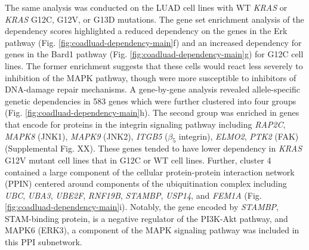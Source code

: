 \documentclass[english, 10pt, letterpaper]{article}
\newcommand{\KRAS}{\emph{KRAS}}
\begin{document}
The same analysis was conducted on the LUAD cell lines with WT \KRAS{} or \KRAS{} G12C, G12V, or G13D mutations.
The gene set enrichment analysis of the dependency scores highlighted a reduced dependency on the genes in the Erk pathway (Fig. \ref{fig:coadluad-dependency-main}f) and an increased dependency for genes in the Bard1 pathway (Fig. \ref{fig:coadluad-dependency-main}g) for G12C cell lines.
The former enrichment suggests that these cells would react less severely to inhibition of the MAPK pathway, though were more susceptible to inhibitors of DNA-damage repair mechanisms.
A gene-by-gene analysis revealed allele-specific genetic dependencies in 583 genes which were further clustered into four groups (Fig. \ref{fig:coadluad-dependency-main}h).
The second group was enriched in genes that encode for proteins in the integrin signaling pathway including \emph{RAP2C}, \emph{MAPK8} (JNK1), \emph{MAPK9} (JNK2), \emph{ITGB5} ($\beta_5$ integrin), \emph{ELMO2}, \emph{PTK2} (FAK) (Supplemental Fig. XX).
These genes tended to have lower dependency in \KRAS{} G12V mutant cell lines that in G12C or WT cell lines.
Further, cluster 4 contained a large component of the cellular protein-protein interaction network (PPIN) centered around components of the ubiquitination complex including \emph{UBC}, \emph{UBA3}, \emph{UBE2F}, \emph{RNF19B}, \emph{STAMBP}, \emph{USP14}, and \emph{FEM1A} (Fig. \ref{fig:coadluad-dependency-main}i).
Notably, the gene encoded by \emph{STAMBP}, STAM-binding protein, is a negative regulator of the PI3K-Akt pathway, and MAPK6 (ERK3), a component of the MAPK signaling pathway was included in this PPI subnetwork. 
\end{document}
